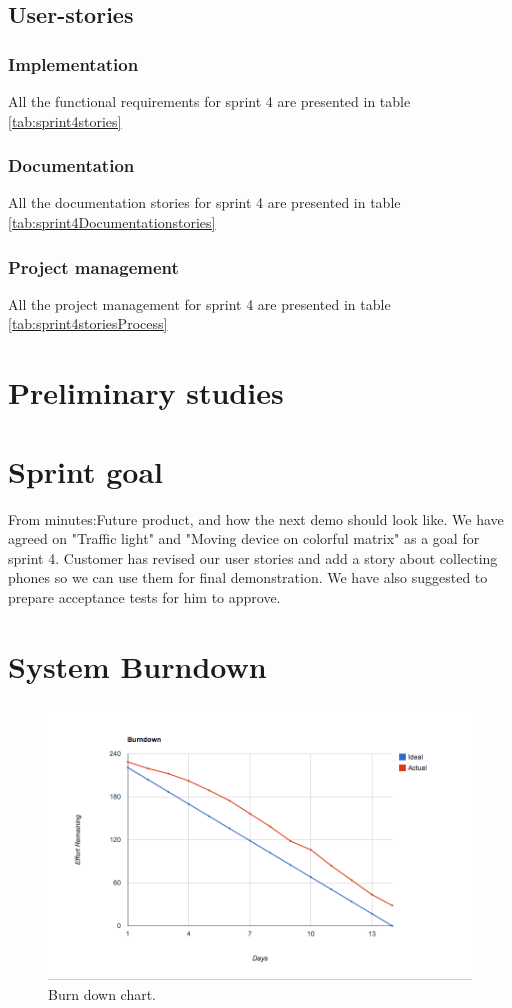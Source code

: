 \subsection{User-stories}
\subsubsection*{Implementation}
All the functional requirements for sprint 4 are presented in table \ref{tab:sprint4stories}

\subsubsection*{Documentation}
All the documentation stories for sprint 4 are presented in table \ref{tab:sprint4Documentationstories}

\subsubsection*{Project management}
All the project management for sprint 4 are presented in table \ref{tab:sprint4storiesProcess}

\section{Preliminary studies}
\section{Sprint goal}
From  minutes:Future product, and how the next demo should look like. We have agreed on "Traffic
light" and "Moving device on colorful matrix" as a goal for sprint 4. Customer has revised our user stories and add a story about collecting phones so we can use them for final demonstration. We have also suggested to prepare acceptance tests for him to approve.
\section{System Burndown}
\begin{figure}[H]
	\centering
		\includegraphics[width=18cm]{sprint4/BurndownSprint4.png}
	\caption{Burn down chart.}
	\label{fig:Burn4 }
\end{figure}
